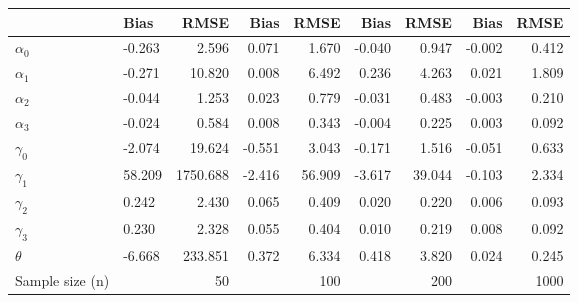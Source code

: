 
\begin{tabular}[t]{llrrrrrrr}
\toprule
  & Bias & RMSE & Bias & RMSE & Bias & RMSE & Bias & RMSE\\
\midrule
$\alpha_{0}$ & -0.263 & 2.596 & 0.071 & 1.670 & -0.040 & 0.947 & -0.002 & 0.412\\
$\alpha_{1}$ & -0.271 & 10.820 & 0.008 & 6.492 & 0.236 & 4.263 & 0.021 & 1.809\\
$\alpha_{2}$ & -0.044 & 1.253 & 0.023 & 0.779 & -0.031 & 0.483 & -0.003 & 0.210\\
$\alpha_{3}$ & -0.024 & 0.584 & 0.008 & 0.343 & -0.004 & 0.225 & 0.003 & 0.092\\
$\gamma_{0}$ & -2.074 & 19.624 & -0.551 & 3.043 & -0.171 & 1.516 & -0.051 & 0.633\\
$\gamma_{1}$ & 58.209 & 1750.688 & -2.416 & 56.909 & -3.617 & 39.044 & -0.103 & 2.334\\
$\gamma_{2}$ & 0.242 & 2.430 & 0.065 & 0.409 & 0.020 & 0.220 & 0.006 & 0.093\\
$\gamma_{3}$ & 0.230 & 2.328 & 0.055 & 0.404 & 0.010 & 0.219 & 0.008 & 0.092\\
$\theta$ & -6.668 & 233.851 & 0.372 & 6.334 & 0.418 & 3.820 & 0.024 & 0.245\\
Sample size (n) &  & 50 &  & 100 &  & 200 &  & 1000\\
\bottomrule
\end{tabular}

